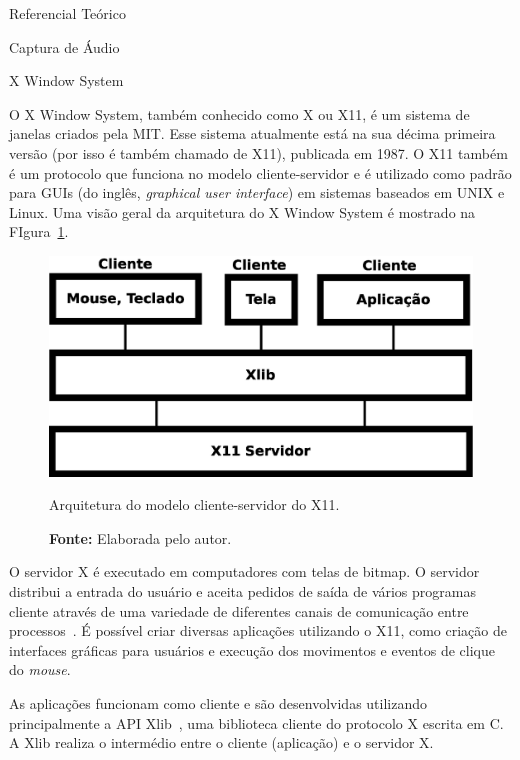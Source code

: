 \begin{chapter}{Referencial Teórico}
\begin{section}{Captura de Áudio}
\end{section}

\begin{section}{X Window System}

O X Window System, também conhecido como X ou X11, é um sistema de janelas
criados pela MIT. Esse sistema atualmente está na sua décima primeira versão
(por isso é também chamado de X11), publicada em 1987. O X11 também é um
protocolo que funciona no modelo cliente-servidor e é utilizado como padrão para
GUIs (do inglês, \textit{graphical user interface}) em sistemas baseados em UNIX
e Linux. Uma visão geral da arquitetura do X Window System é mostrado na
FIgura~\ref{fig:x11}.

\begin{figure}[!h]
	\centering
	\begin{minipage}[c]{\textwidth}
	\centering
	\includegraphics[width=0.6\linewidth]{fig/X11}
	\caption{Arquitetura do modelo cliente-servidor do X11.}
	\vspace{-1cm}
	\caption*{\textbf{Fonte: }Elaborada pelo autor.}
	\label{fig:x11}
	\end{minipage}
\end{figure} 

\vspace{-0.5cm}
O servidor X é executado em computadores com telas de bitmap. O servidor
distribui a entrada do usuário e aceita pedidos de saída de vários programas
cliente através de uma variedade de diferentes canais de comunicação entre
processos~\cite{suse}. É possível criar diversas aplicações utilizando o X11,
como criação de interfaces gráficas para usuários e execução dos movimentos e
eventos de clique do \textit{mouse}. 

As aplicações funcionam como cliente e são desenvolvidas utilizando 
principalmente a API Xlib~\cite{xlib}, uma biblioteca cliente do protocolo X escrita
em C. A Xlib realiza o intermédio entre o cliente (aplicação) e o servidor X.  
\end{section}

\end{chapter}
